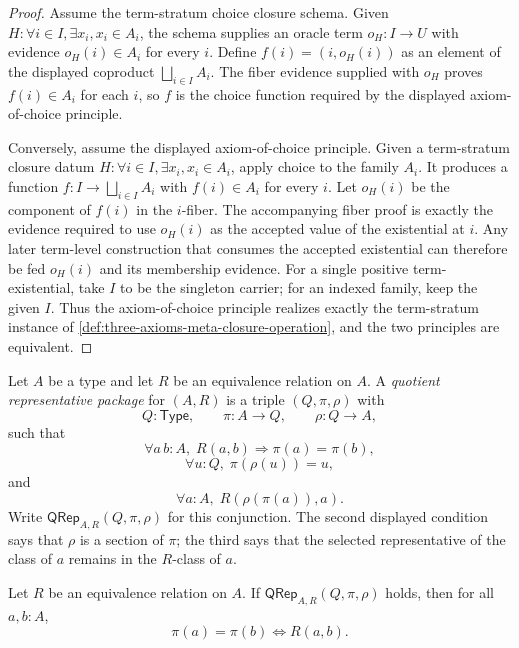 \begin{proof}
Assume the term-stratum choice closure schema. Given $H:\forall i\in I,\exists x_i, x_i\in A_i$, the schema supplies an oracle term $o_H:I\to U$ with evidence $o_H(i)\in A_i$ for every $i$. Define $f(i)=(i,o_H(i))$ as an element of the displayed coproduct $\bigsqcup_{i\in I}A_i$. The fiber evidence supplied with $o_H$ proves $f(i)\in A_i$ for each $i$, so $f$ is the choice function required by the displayed axiom-of-choice principle.

Conversely, assume the displayed axiom-of-choice principle. Given a term-stratum closure datum $H:\forall i\in I,\exists x_i,x_i\in A_i$, apply choice to the family $A_i$. It produces a function $f:I\to\bigsqcup_{i\in I}A_i$ with $f(i)\in A_i$ for every $i$. Let $o_H(i)$ be the component of $f(i)$ in the $i$-fiber. The accompanying fiber proof is exactly the evidence required to use $o_H(i)$ as the accepted value of the existential at $i$. Any later term-level construction that consumes the accepted existential can therefore be fed $o_H(i)$ and its membership evidence. For a single positive term-existential, take $I$ to be the singleton carrier; for an indexed family, keep the given $I$. Thus the axiom-of-choice principle realizes exactly the term-stratum instance of \autoref{def:three-axioms-meta-closure-operation}, and the two principles are equivalent.
\end{proof}

\begin{definition}
\label{def:quotient-representative-package}
Let $A$ be a type and let $R$ be an equivalence relation on $A$. A \emph{quotient representative package} for $(A,R)$ is a triple $(Q,\pi,\rho)$ with
$$
Q:\mathsf{Type},\qquad \pi:A\to Q,\qquad \rho:Q\to A,
$$
such that
$$
\forall a\,b:A,\; R(a,b)\Longrightarrow \pi(a)=\pi(b),
$$
$$
\forall u:Q,\; \pi(\rho(u))=u,
$$
and
$$
\forall a:A,\; R(\rho(\pi(a)),a).
$$
Write $\mathsf{QRep}_{A,R}(Q,\pi,\rho)$ for this conjunction. The second displayed condition says that $\rho$ is a section of $\pi$; the third says that the selected representative of the class of $a$ remains in the $R$-class of $a$.
\end{definition}

\begin{lemma}
\label{lem:quotient-representative-package-exact}
Let $R$ be an equivalence relation on $A$. If $\mathsf{QRep}_{A,R}(Q,\pi,\rho)$ holds, then for all $a,b:A$,
$$
\pi(a)=\pi(b)\Longleftrightarrow R(a,b).
$$
\end{lemma}

